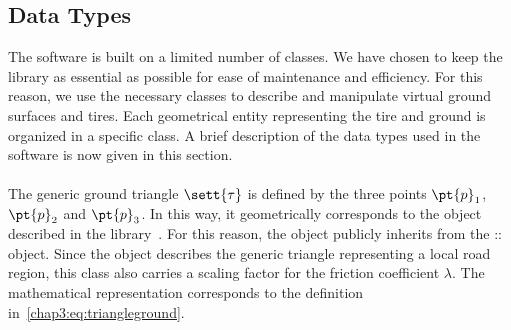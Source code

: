 \subsection{Data Types}
\label{chap3:DataTypes}

The software is built on a limited number of classes. We have chosen to keep the library as essential as possible for ease of maintenance and efficiency. For this reason, we use the necessary classes to describe and manipulate virtual ground surfaces and tires. Each geometrical entity representing the tire and ground is organized in a specific class. A brief description of the data types used in the software is now given in this section.

\paragraph*{\TriangleGround{}}
The generic ground triangle $\sett{\tau}$ is defined by the three points $\pt{p}_1$, $\pt{p}_2$ and $\pt{p}_3$. In this way, it geometrically corresponds to the \Triangle{} object described in the \Acme{} library~\cite{stocco2021acme}. For this reason, the \TriangleGround{} object publicly inherits from the \Acme{}::\Triangle{} object. Since the \TriangleGround{} object describes the generic triangle representing a local road region, this class also carries a scaling factor for the friction coefficient $\lambda$. The mathematical representation corresponds to the definition in~\eqref{chap3:eq:triangleground}.

